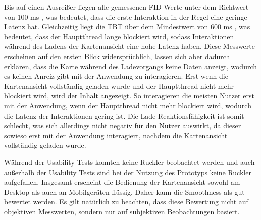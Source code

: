 Bis auf einen Ausreißer liegen alle gemessenen \ac{FID}-Werte unter dem Richtwert von 100 ms \cite{FID}, was bedeutet, dass die erste Interaktion in der Regel eine geringe Latenz hat. Gleichzeitig liegt die \ac{TBT} über dem Mindestwert von 600 ms \cite{TBT}, was bedeutet, dass der Hauptthread lange blockiert wird, sodass Interaktionen während des Ladens der Kartenansicht eine hohe Latenz haben. Diese Messwerte erscheinen auf den ersten Blick widersprüchlich, lassen sich aber dadurch erklären, dass die Karte während des Ladevorgangs keine Daten anzeigt, wodurch es keinen Anreiz gibt mit der Anwendung zu interagieren. Erst wenn die Kartenansicht vollständig geladen wurde und der Hauptthread nicht mehr blockiert wird, wird der Inhalt angezeigt. So interagieren die meisten Nutzer erst mit der Anwendung, wenn der Hauptthread nicht mehr blockiert wird, wodurch die Latenz der Interaktionen gering ist. Die Lade-Reaktionsfähigkeit ist somit schlecht, was sich allerdings nicht negativ für den Nutzer auswirkt, da dieser sowieso erst mit der Anwendung interagiert, nachdem die Kartenansicht vollständig geladen wurde.

Während der Usability Tests konnten keine Ruckler beobachtet werden und auch außerhalb der Usability Tests sind bei der Nutzung des Prototyps keine Ruckler aufgefallen. Insgesamt erscheint die Bedienung der Kartenansicht sowohl am Desktop als auch an Mobilgeräten flüssig. Daher kann die Smoothness als gut bewertet werden. Es gilt natürlich zu beachten, dass diese Bewertung nicht auf objektiven Messwerten, sondern nur auf subjektiven Beobachtungen basiert.

